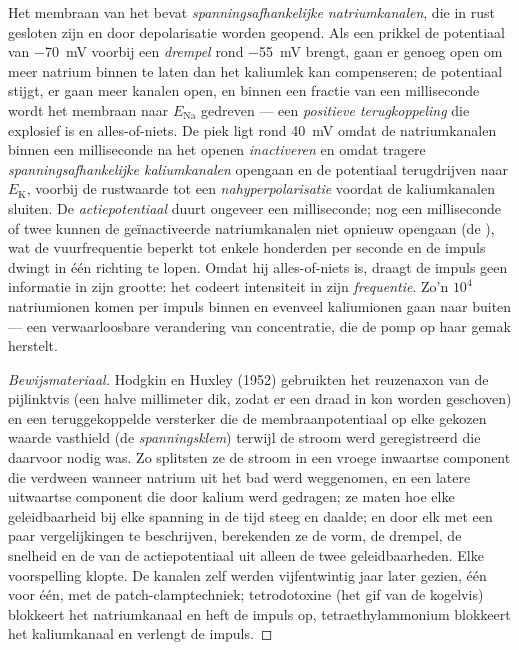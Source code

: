 \begin{proposition}[De impuls]\label{prop:b2:neurons-synapses:ap}
Het membraan van het  bevat \emph{spanningsafhankelijke natriumkanalen},
die in rust gesloten zijn en door depolarisatie worden geopend. Als een
prikkel de potentiaal van \qty{-70}{mV} voorbij een \emph{drempel} rond
\qty{-55}{mV} brengt, gaan er genoeg open om meer natrium binnen te laten dan
het kaliumlek kan compenseren; de potentiaal stijgt, er gaan meer kanalen
open, en binnen een fractie van een milliseconde wordt het membraan naar
$E_{\mathrm{Na}}$ gedreven --- een \emph{positieve terugkoppeling} die
explosief is en alles-of-niets. De piek ligt rond \qty{+40}{mV} omdat de
natriumkanalen binnen een milliseconde na het openen \emph{inactiveren} en
omdat tragere \emph{spanningsafhankelijke kaliumkanalen} opengaan en de
potentiaal terugdrijven naar $E_{\mathrm K}$, voorbij de rustwaarde tot een
\emph{nahyperpolarisatie} voordat de kaliumkanalen sluiten. De
\emph{actiepotentiaal} duurt ongeveer een milliseconde; nog een milliseconde
of twee kunnen de geïnactiveerde natriumkanalen niet opnieuw opengaan (de
\emph{}), wat de vuurfrequentie beperkt tot enkele
honderden per seconde en de impuls dwingt in één richting te lopen.
Omdat hij alles-of-niets is, draagt de impuls geen informatie in zijn
grootte: het  codeert intensiteit in zijn \emph{frequentie}. Zo'n
$10^{4}$ natriumionen komen per impuls binnen en evenveel kaliumionen gaan
naar buiten --- een verwaarloosbare verandering van concentratie, die de
pomp op haar gemak herstelt.
\end{proposition}
\begin{proof}[Bewijsmateriaal]
Hodgkin en Huxley (1952) gebruikten het reuzenaxon van de pijlinktvis (een
halve millimeter dik, zodat er een draad in kon worden geschoven) en een
teruggekoppelde versterker die de membraanpotentiaal op elke gekozen waarde
vasthield (de \emph{spanningsklem}) terwijl de stroom werd geregistreerd die
daarvoor nodig was. Zo splitsten ze de stroom in een vroege inwaartse
component die verdween wanneer natrium uit het bad werd weggenomen, en een
latere uitwaartse component die door kalium werd gedragen; ze maten hoe elke
geleidbaarheid bij elke spanning in de tijd steeg en daalde; en door elk met
een paar vergelijkingen te beschrijven, berekenden ze de vorm, de drempel,
de snelheid en de  van de actiepotentiaal uit alleen de
twee geleidbaarheden. Elke voorspelling klopte. De kanalen zelf werden
vijfentwintig jaar later gezien, één voor één, met de patch-clamptechniek;
tetrodotoxine (het gif van de kogelvis) blokkeert het natriumkanaal en heft
de impuls op, tetraethylammonium blokkeert het kaliumkanaal en verlengt de
impuls.
\end{proof}

